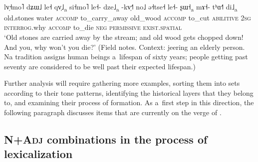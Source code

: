 \begin{exe}
	\ex
	\label{ex:whydontyou}
		\\
		\gll lv̩˧mo˥		dʑɯ˩	le˧					qv̩˩\textsubscript{a}	si˧mo˥		le˧-	dze˩\textsubscript{a}	-kv̩˧˥		no˩		ə˧tse˧	le˧-	ʂɯ˧\textsubscript{a}	mɤ˧-	tʰɑ˧˥ 	di˩\textsubscript{a}\\
		old.stones		water	\textsc{accomp}	to\_carry\_away			old\_wood	\textsc{accomp}	to\_cut		\textsc{abilitive}		\textsc{2sg}	\textsc{interrog.}why	\textsc{accomp}		to\_die		\textsc{neg}	\textsc{permissive}	\textsc{exist.spatial}\\
		\glt ‘Old stones are carried away by the stream; and old wood gets chopped down! And you, why won't you die?' (Field notes. Context: jeering an elderly person. Na tradition assigns human beings a~lifespan of sixty years; people getting past seventy are considered to be well past their expected lifespan.)
\end{exe}

Further analysis will require gathering more examples, sorting them into sets according to their tone patterns, identifying the historical layers that they belong to, and examining their process of formation. As a~first step in this direction, the following paragraph discusses items that are currently on the verge of .

\subsection{\textsc{N}+\textsc{Adj} combinations in the process of lexicalization}
\label{sec:nadjitemscurrentlyintheprocessoflexicalization}


